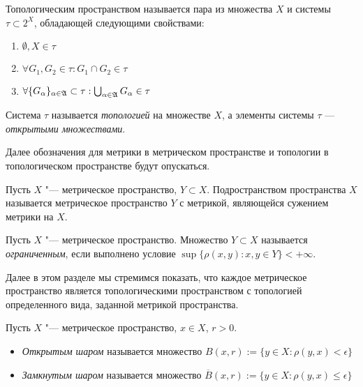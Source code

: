 \begin{definition}
	Топологическим пространством называется пара из множества $X$ и системы $\tau \subset 2^X$, обладающей следующими свойствами:
	\begin{enumerate}
		\item $\emptyset, X \in \tau$
		\item $\forall G_1, G_2 \in \tau: G_1 \cap G_2 \in \tau$
		\item $\forall \{G_\alpha\}_{\alpha \in \mathfrak A} \subset \tau: \bigcup_{\alpha \in \mathfrak A}G_\alpha\in \tau$
	\end{enumerate}
	
	Система $\tau$ называется \textit{топологией} на множестве $X$, а элементы системы $\tau$ --- \textit{открытыми множествами}.
\end{definition}

\begin{note}
	Далее обозначения для метрики в метрическом пространстве и топологии в топологическом пространстве будут опускаться.
\end{note}

\begin{definition}
	Пусть $X$ "--- метрическое пространство, $Y \subset X$. Подространством пространства $X$ называется метрическое пространство $Y$ с метрикой, являющейся сужением метрики на $X$.
\end{definition}

\begin{definition}
	Пусть $X$ "--- метрическое пространство. Множество $Y \subset X$ называется \textit{ограниченным}, если выполнено условие $\sup\{\rho(x, y): x, y \in Y\} < +\infty$.
\end{definition}

\begin{note}
	Далее в этом разделе мы стремимся показать, что каждое метрическое пространство является топологическими пространством с топологией определенного вида, заданной метрикой пространства.
\end{note}

\begin{definition}
	Пусть $X$ "--- метрическое пространство, $x \in X$, $r > 0$.
	\begin{itemize}
		\item \textit{Открытым шаром} называется множество $B(x, r) := \{y \in X: \rho(y, x) < \epsilon\}$
		
		\item \textit{Замкнутым шаром} называется множество $\overline B(x, r) := \{y \in X: \rho(y, x) \le \epsilon\}$
	\end{itemize}
\end{definition}

